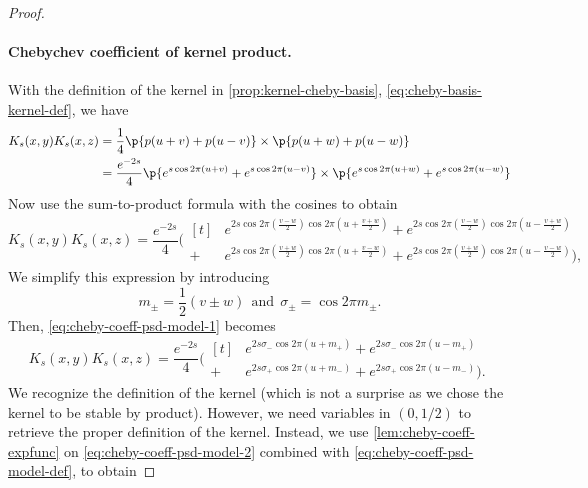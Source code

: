 \documentclass{article}
\begin{document}
\begin{proof}
  ~\paragraph{Chebychev coefficient of kernel product.}
  With the definition of the kernel in \cref{prop:kernel-cheby-basis}, \cref{eq:cheby-basis-kernel-def}, we have
  \begin{align*}
    K_s(x, y) K_s(x, z)
     & = \frac{1}{4} \p{p(u + v) + p(u - v)} \times \p{p(u + w) + p(u - w)}                                                               \\
     & = \frac{e^{-2s}}{4} \p{e^{s \cos 2\pi(u + v)} + e^{s \cos 2\pi(u - v)}} \times \p{e^{s \cos 2\pi(u + w)} + e^{s \cos 2\pi(u - w)}}
  \end{align*}
  Now use the sum-to-product formula with the cosines to obtain
  \begin{equation}\label{eq:cheby-coeff-psd-model-1}
    K_s(x, y) K_s(x, z)
    = \frac{e^{-2s}}{4} \Biggl(
    \begin{aligned}[t]
        & e^{2s \cos 2\pi(\frac{v - w}{2}) \cos 2\pi(u + \frac{v + w}{2})}
      +e^{2s \cos 2\pi(\frac{v - w}{2}) \cos 2\pi(u - \frac{v + w}{2})}    \\
      + & e^{2s \cos 2\pi(\frac{v + w}{2}) \cos 2\pi(u + \frac{v - w}{2})}
      +e^{2s \cos 2\pi(\frac{v + w}{2}) \cos 2\pi(u - \frac{v - w}{2})}\Biggr),
    \end{aligned}
  \end{equation}
  We simplify this expression by introducing
  \begin{equation}
    m_\pm = \frac{1}{2}(v \pm w)
    ~~ \text{and} ~~
    \sigma_{\pm} = \cos 2\pi m_\pm.
  \end{equation}
  Then, \cref{eq:cheby-coeff-psd-model-1} becomes
  \begin{equation}\label{eq:cheby-coeff-psd-model-2}
    K_s(x, y) K_s(x, z)
    = \frac{e^{-2s}}{4} \Biggl(
    \begin{aligned}[t]
        & e^{2s \sigma_- \cos 2\pi(u + m_+)}
      +e^{2s \sigma_- \cos 2\pi(u - m_+)}    \\
      + & e^{2s \sigma_+ \cos 2\pi(u + m_-)}
      +e^{2s \sigma_+ \cos 2\pi(u - m_-)}\Biggr).
    \end{aligned}
  \end{equation}
  We recognize the definition of the kernel (which is not a surprise as we chose the kernel to be stable by product). However, we need variables in $(0,1/2)$ to retrieve the proper definition of the kernel. Instead, we use \cref{lem:cheby-coeff-expfunc} on \cref{eq:cheby-coeff-psd-model-2} combined with \cref{eq:cheby-coeff-psd-model-def}, to obtain

\end{proof}
\end{document}
